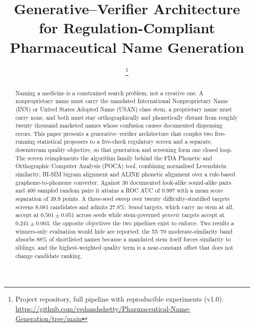 \documentclass[conference]{IEEEtran}
\begin{document}
\title{Generative--Verifier Architecture for Regulation-Compliant\\ Pharmaceutical Name Generation}

\author{%
\thanks{Project repository, full pipeline with reproducible experiments (v1.0): \url{https://github.com/vedanshshetty/Pharmaceutical-Name-Generation/tree/main}}
}

\maketitle

\begin{abstract}
Naming a medicine is a constrained search problem, not a creative one. A
nonproprietary name must carry the mandated International Nonproprietary Name
(INN) or United States Adopted Name (USAN) class stem, a proprietary name must
carry none, and both must stay orthographically and phonetically distant from
roughly twenty thousand marketed names whose confusion causes documented
dispensing errors. This paper presents a generative--verifier architecture that
couples two free-running statistical proposers to a five-check regulatory screen
and a separate, downstream quality objective, so that generation and screening
form one closed loop. The screen reimplements the algorithm family behind the
FDA Phonetic and Orthographic Computer Analysis (POCA) tool, combining
normalised Levenshtein similarity, BI-SIM bigram alignment and ALINE phonetic
alignment over a rule-based grapheme-to-phoneme converter. Against 30 documented
look-alike sound-alike pairs and 400 sampled random pairs it attains a ROC AUC of
0.997 with a mean score separation of 39.9 points. A three-seed sweep over
twenty difficulty-stratified targets screens 8,081 candidates and admits 27.8\%:
\emph{brand} targets, which carry no stem at all, accept at $0.501 \pm 0.051$
across seeds while stem-governed \emph{generic} targets accept at $0.241 \pm
0.003$, the opposite objectives the two pipelines exist to enforce. Two results
a winners-only evaluation would hide are reported: the 55--70 moderate-similarity
band absorbs 88\% of shortlisted names because a mandated stem itself forces
similarity to siblings, and the highest-weighted quality term is a near-constant
offset that does not change candidate ranking.
\end{abstract}
\end{document}

